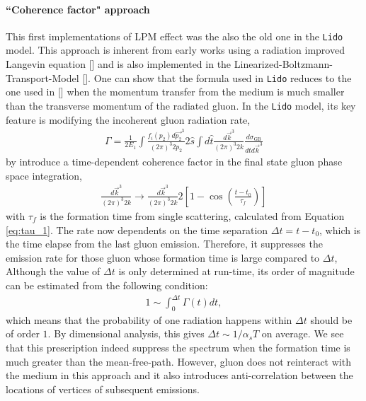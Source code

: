 \documentclass[aps, prc, reprint, amsmath, groupedaddress, nofootinbib]{revtex4-1}
\begin{document}
\paragraph*{``Coherence factor" approach} This first implementations of LPM effect was the also the old one in the {\tt Lido} model. 
This approach is inherent from early works using a radiation improved Langevin equation [] and is also implemented in the Linearized-Boltzmann-Transport-Model []. 
One can show that the formula used in {\tt Lido} reduces to the one used in [] when the momentum transfer from the medium is much smaller than the transverse momentum of the radiated gluon.
In the {\tt Lido} model, its key feature is modifying the incoherent gluon radiation rate,
\begin{eqnarray}\label{eq:GB-rate}
\Gamma = \frac{1}{2E_1}\int\frac{f_i(p_2)d\vec{p_2}^3}{(2\pi)^3 2p_2}2\hat{s}\int d\hat{t}\frac{d\vec{k}^3}{(2\pi)^3 2k}\frac{d\sigma_{\textrm{GB}}}{d\hat{t}d\vec{k}^3}
\end{eqnarray}
by introduce a time-dependent coherence factor in the final state gluon phase space integration,
\begin{eqnarray}
\frac{d\vec{k}^3}{(2\pi)^3 2k} \rightarrow \frac{d\vec{k}^3}{(2\pi)^3 2k} 2\left[1-\cos\left(\frac{t-t_0}{\tau_f}\right)\right]
\end{eqnarray}
with $\tau_f$ is the formation time from single scattering, calculated from Equation \ref{eq:tau_1}. 
The rate now dependents on the time separation $\Delta t = t-t_0$, which is the time elapse from the last gluon emission.
Therefore, it suppresses the emission rate for those gluon whose formation time is large compared to $\Delta t$, 
Although the value of $\Delta t$ is only determined at run-time,
its order of magnitude can be estimated from the following condition:
\begin{eqnarray}
1 \sim \int_0^{\Delta t}\Gamma(t) dt,
\end{eqnarray}
which means that the probability of one radiation happens within $\Delta t$ should be of order $1$.
By dimensional analysis, this gives $\Delta t \sim 1/\alpha_s T$ on average.
We see that this prescription indeed suppress the spectrum when the formation time is much greater than the mean-free-path.
However, gluon does not reinteract with the medium in this approach and it also introduces anti-correlation between the locations of vertices of subsequent emissions.
\end{document}
